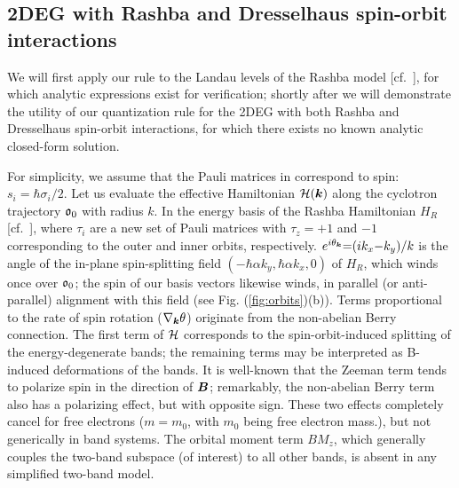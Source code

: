 \documentclass[aps, prb, showpacs, twocolumn, notitlepage, superscriptaddress]{revtex4-1}
\begin{document}
\subsection{2DEG with Rashba and Dresselhaus spin-orbit interactions}\label{sec:Rashba}



We will first apply our rule to the Landau levels of the Rashba model [cf.\ ], for which analytic expressions exist for verification\cite{bychkov_oscillatory_1984}; shortly after we will demonstrate the utility of our quantization rule for the 2DEG with both Rashba and Dresselhaus spin-orbit interactions, for which there exists no known analytic closed-form solution. 

For simplicity, we assume that the Pauli matrices in  correspond to spin: $s_i{=}\hbar \sigma_i/2$. Let us evaluate the effective Hamiltonian ${\cal H}(\boldsymbol{k})$ along the cyclotron trajectory $\mathfrak{o}_0$ with radius $k$. In the energy basis of the Rashba Hamiltonian $H_R$ [cf.\ ], 
where $\tau_i$ are a new set of Pauli matrices with $\tau_z{=}{+} 1$ and ${-}1$ corresponding to the outer and inner orbits, respectively. $e^{i\theta_{\boldsymbol{k}}}{=}(ik_x{-}k_y)/k$ is the angle of the in-plane spin-splitting field $(-\hbar\alpha k_y,\hbar\alpha k_x,0)$ of $H_R$, which winds once over $\mathfrak{o}_0$; the spin of our basis vectors likewise winds, in parallel (or anti-parallel) alignment with this field (see Fig. (\ref{fig:orbits})(b)). Terms proportional to the rate of spin rotation ($\nabla_{\boldsymbol{k}} \theta$) originate from the non-abelian Berry connection. The first term of  ${\cal H}$ corresponds to the spin-orbit-induced splitting of the energy-degenerate bands;
the remaining terms may be interpreted as B-induced deformations of the bands. It is well-known that the Zeeman term tends to polarize spin in the direction of $\boldsymbol{B}$; remarkably, the non-abelian Berry term  also has a polarizing effect, but with opposite sign. These two effects completely cancel for free electrons ($m{=}m_0$, with $m_0$ being free electron mass.), but not generically in band systems. The orbital moment term $B M_z$, which generally couples the two-band subspace (of interest) to all other bands, is absent in any simplified two-band model.
\end{document}
